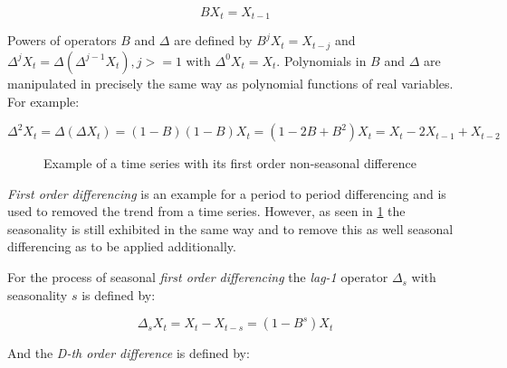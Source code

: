 \begin{equation}\label{eq:bachshift_operator}
	B X_t = X_{t-1}
\end{equation}

Powers of operators \(B\) and \(\Delta\) are defined by \(B^j X_t = X_{t-j}\) and \(\Delta^j X_t = \Delta (\Delta^{j-1} X_t), j >= 1\) with \(\Delta^0 X_t = X_t\). Polynomials in \(B\) and \(\Delta\) are manipulated in precisely the same way as polynomial functions of real variables. For example:

\begin{equation}\label{eq:example_delta_squared}
	\Delta^2 X_t = \Delta (\Delta X_t) = (1-B)(1-B)X_t = (1-2B + B^2) X_t = X_t - 2 X_{t-1} +  X_{t-2}
\end{equation}

\begin{figure}[ht]
	\centering
	\caption{Example of a time series with its first order non-seasonal difference}
  \label{fig:example_non_seasonal_diff}
\end{figure}

\textit{First order differencing} is an example for a period to period differencing and is used to removed the trend from a time series. However, as seen in \ref{fig:example_non_seasonal_diff} the seasonality is still exhibited in the same way and to remove this as well seasonal differencing as to be applied additionally.

For the process of seasonal \textit{first order differencing} the \textit{lag-1} operator \(\Delta_s\) with seasonality \(s\) is defined by:

\begin{equation}\label{eq:seasonal_first_difference}
	\Delta_s X_t = X_t - X_{t-s} = (1-B^s)X_t
\end{equation}

And the \textit{D-th order difference} is defined by:

